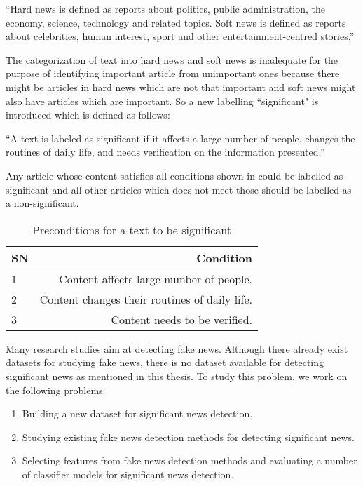 \enquote{Hard news is defined as reports about politics, public administration, the economy, science, technology and related topics. Soft news is defined as reports about celebrities, human interest, sport and other entertainment-centred stories.}

The categorization of text into hard news and soft news is inadequate for the purpose of identifying important article from unimportant ones because there might be articles in hard news which are not that important and soft news might also have articles which are important. So a new labelling ``significant" is introduced which is defined as follows:

\enquote{A text is labeled as significant if it affects a large number of people, changes the routines of daily life, and needs verification on the information presented.}

Any article whose content satisfies all conditions shown in  could be labelled as significant and all other articles which does not meet those should be labelled as a non-significant.

\begin{table}[h]
\begin{center}
\caption{Preconditions for a text to be significant}
\label{tbl:significant_preconditions}
\begin{tabular}{l | r}
\toprule
SN & Condition \\
\midrule
1 & Content affects large number of people. \\
2 & Content changes their routines of daily life. \\
3 & Content needs to be verified. \\
\bottomrule
\end{tabular}
\end{center}
\end{table}


Many research studies aim at detecting fake news. Although there already exist datasets for studying fake news, there is no dataset available for detecting significant news as mentioned in this thesis. To study this problem, we work on the following problems:

\begin{enumerate}
    \item Building a new dataset for significant news detection.
    \item Studying existing fake news detection methods for detecting significant news.
    \item Selecting features from fake news detection methods and evaluating a number of classifier models for significant news detection.
\end{enumerate}

